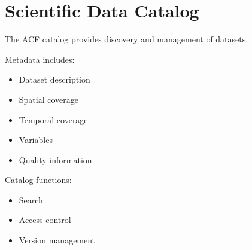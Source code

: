 \section{Scientific Data Catalog}


The ACF catalog provides discovery and management of datasets.



Metadata includes:


\begin{itemize}

\item Dataset description

\item Spatial coverage

\item Temporal coverage

\item Variables

\item Quality information

\end{itemize}



Catalog functions:


\begin{itemize}

\item Search

\item Access control

\item Version management

\end{itemize}
